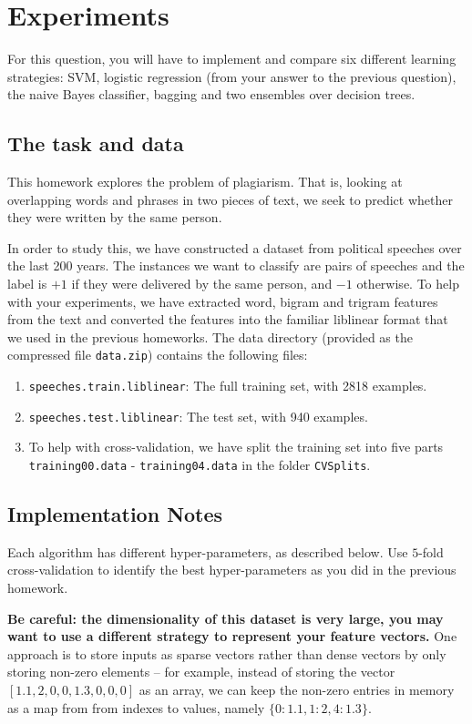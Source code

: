 \section{Experiments}\label{sec:q2}

For this question, you will have to implement and compare six
different learning strategies: SVM, logistic regression (from your
answer to the previous question), the naive Bayes classifier, bagging
and two ensembles over decision trees.

\subsection{The task and data}
This homework explores the problem of plagiarism.  That is, looking at
overlapping words and phrases in two pieces of text, we seek to
predict whether they were written by the same person.

In order to study this, we have constructed a dataset from political
speeches over the last 200 years. The instances we want to classify
are pairs of speeches and the label is $+1$ if they were delivered by
the same person, and $-1$ otherwise. To help with your experiments, we
have extracted word, bigram and trigram features from the text and
converted the features into the familiar liblinear format that we used
in the previous homeworks. The data directory (provided as the
compressed file {\tt data.zip}) contains the following files:

\begin{enumerate}
\item {\tt speeches.train.liblinear}: The full training set, with 2818
  examples.
\item {\tt speeches.test.liblinear}: The test set, with 940 examples.
\item To help with cross-validation, we have split the training set
  into five parts {\tt training00.data} - {\tt training04.data} in the
  folder {\tt CVSplits}.
\end{enumerate}

\subsection{Implementation Notes}

Each algorithm has different hyper-parameters, as described below.
Use $5$-fold cross-validation to identify the best hyper-parameters as
you did in the previous homework.

\textbf{Be careful: the dimensionality of this dataset is very large,
  you may want to use a different strategy to represent your feature
  vectors.} One approach is to store inputs as sparse vectors rather
than dense vectors by only storing non-zero elements -- for example,
instead of storing the vector $[1.1,2,0,0,1.3,0,0,0]$ as an array, we
can keep the non-zero entries in memory as a map from from indexes to
values, namely $\{0:1.1, 1:2, 4:1.3\}$.

